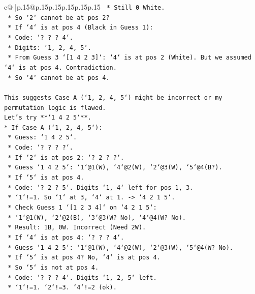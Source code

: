 \documentclass{article}
\begin{document}
{\begin{supertabular}{c@{$\;$}|p{.15\linewidth}@{}p{.15\linewidth}p{.15\linewidth}p{.15\linewidth}p{.15\linewidth}p{.15\linewidth}}
{{{\texttt{            *   Still 0 White.} \\
\texttt{        *   So `2` cannot be at pos 2?} \\
\texttt{    *   If `4` is at pos 4 (Black in Guess 1):} \\
\texttt{        *   Code: `? ? ? 4`.} \\
\texttt{        *   Digits: `1, 2, 4, 5`.} \\
\texttt{        *   From Guess 3 `{[}1 4 2 3{]}`: `4` is at pos 2 (White). But we assumed `4` is at pos 4. Contradiction.} \\
\texttt{        *   So `4` cannot be at pos 4.} \\
\\ 
\texttt{This suggests Case A (`1, 2, 4, 5`) might be incorrect or my permutation logic is flawed.} \\
\texttt{Let's try **`1 4 2 5`**.} \\
\texttt{*   If Case A (`1, 2, 4, 5`):} \\
\texttt{    *   Guess: `1 4 2 5`.} \\
\texttt{    *   Code: `? ? ? ?`.} \\
\texttt{    *   If `2` is at pos 2: `? 2 ? ?`.} \\
\texttt{        *   Guess `1 4 2 5`: `1`@1(W), `4`@2(W), `2`@3(W), `5`@4(B?).} \\
\texttt{        *   If `5` is at pos 4.} \\
\texttt{        *   Code: `? 2 ? 5`. Digits `1, 4` left for pos 1, 3.} \\
\texttt{        *   `1`!=1. So `1` at 3, `4` at 1. {-}> `4 2 1 5`.} \\
\texttt{        *   Check Guess 1 `{[}1 2 3 4{]}` on `4 2 1 5`:} \\
\texttt{            *   `1`@1(W), `2`@2(B), `3`@3(W? No), `4`@4(W? No).} \\
\texttt{            *   Result: 1B, 0W. Incorrect (Need 2W).} \\
\texttt{    *   If `4` is at pos 4: `? ? ? 4`.} \\
\texttt{        *   Guess `1 4 2 5`: `1`@1(W), `4`@2(W), `2`@3(W), `5`@4(W? No).} \\
\texttt{        *   If `5` is at pos 4? No, `4` is at pos 4.} \\
\texttt{        *   So `5` is not at pos 4.} \\
\texttt{        *   Code: `? ? ? 4`. Digits `1, 2, 5` left.} \\
\texttt{        *   `1`!=1. `2`!=3. `4`!=2 (ok).} \\
}}}
\end{supertabular}}
\end{document}
